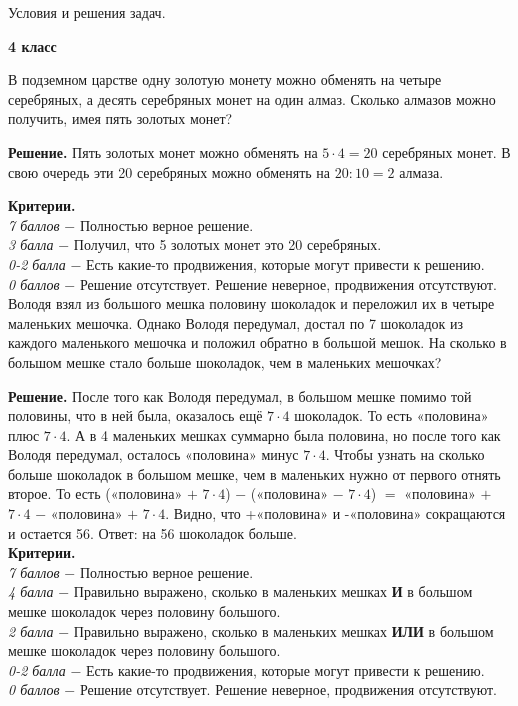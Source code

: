 \centerline{\Huge Условия и решения задач.}
\centerline{\bf \Huge 4 класс}

 В подземном царстве одну золотую монету можно обменять на четыре серебряных, а десять серебряных монет на один алмаз. Сколько алмазов можно получить, имея пять золотых монет? \par

\textbf{Решение.} Пять золотых монет можно обменять на $5\cdot4 = 20$ серебряных монет. В свою очередь эти 20 серебряных можно обменять на $20:10 = 2$ алмаза.  \par

\textbf{Критерии.} \\
\textit{7 баллов} $-$ Полностью верное решение.\\
\textit{3 балла} $-$ Получил, что 5 золотых монет это 20 серебряных.\\
\textit{0-2 балла} $-$ Есть какие-то продвижения, которые могут привести к решению. \\ 
\textit{0 баллов} $-$ Решение отсутствует. Решение неверное, продвижения отсутствуют. \\


 Володя взял из большого мешка половину шоколадок и переложил их в четыре маленьких мешочка. Однако Володя передумал, достал по 7 шоколадок из каждого маленького мешочка и положил обратно в большой мешок. На сколько в большом мешке стало больше шоколадок, чем в маленьких мешочках? \par

\textbf{Решение.} После того как Володя передумал, в большом мешке помимо той половины, что в ней была, оказалось ещё $7\cdot4$ шоколадок. То есть «половина» плюс $7\cdot4$. А в 4 маленьких мешках суммарно была половина, но после того как Володя передумал, осталось «половина» минус $7\cdot4$. Чтобы узнать на сколько больше шоколадок в большом мешке, чем в маленьких нужно от первого отнять второе. То есть  («половина» $+$ $7\cdot4$) $-$ («половина» $-$ $7\cdot4$) $=$ «половина» $+$ $7\cdot4$ $-$ «половина» $+$ $7\cdot4$. Видно, что +«половина» и -«половина» сокращаются и остается 56. Ответ: на 56 шоколадок больше. \\

\textbf{Критерии.} \\
\textit{7 баллов} $-$ Полностью верное решение.\\
\textit{4 балла} $-$ Правильно выражено, сколько в маленьких мешках \textbf{И} в большом мешке шоколадок через половину большого.\\
\textit{2 балла} $-$ Правильно выражено, сколько в маленьких мешках \textbf{ИЛИ} в большом мешке шоколадок через половину большого.\\
\textit{0-2 балла} $-$ Есть какие-то продвижения, которые могут привести к решению. \\ 
\textit{0 баллов} $-$ Решение отсутствует. Решение неверное, продвижения отсутствуют. \\ 

